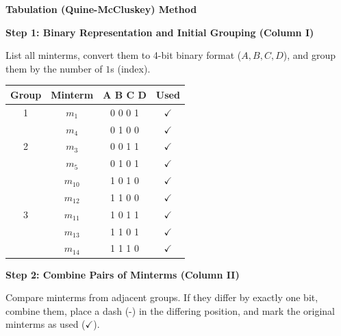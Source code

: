 \documentclass[12pt,a3paper]{article}
\begin{document}
\begin{enumerate}
\begin{tcolorbox}[enhanced,breakable,ansbox,colback=cC!4,colframe=cC,boxrule=0.8pt,arc=5pt,title={\textbf{Answer}},fonttitle=\bfseries\color{white},colbacktitle=cC]
\textbf{\large Tabulation (Quine-McCluskey) Method}

\vspace{0.5em}
\textbf{Step 1: Binary Representation and Initial Grouping (Column I)}

List all minterms, convert them to 4-bit binary format ($A, B, C, D$), and group them by the number of $1$s (index).

\begin{center}
\begin{tabular}{cccc}
\toprule
\textbf{Group} & \textbf{Minterm} & \textbf{A B C D} & \textbf{Used} \\
\midrule
1 & $m_1$  & 0 0 0 1 & $\checkmark$ \\
  & $m_4$  & 0 1 0 0 & $\checkmark$ \\
\midrule
2 & $m_3$  & 0 0 1 1 & $\checkmark$ \\
  & $m_5$  & 0 1 0 1 & $\checkmark$ \\
  & $m_{10}$ & 1 0 1 0 & $\checkmark$ \\
  & $m_{12}$ & 1 1 0 0 & $\checkmark$ \\
\midrule
3 & $m_{11}$ & 1 0 1 1 & $\checkmark$ \\
  & $m_{13}$ & 1 1 0 1 & $\checkmark$ \\
  & $m_{14}$ & 1 1 1 0 & $\checkmark$ \\
\bottomrule
\end{tabular}
\end{center}

\vspace{1em}
\textbf{Step 2: Combine Pairs of Minterms (Column II)}

Compare minterms from adjacent groups. If they differ by exactly one bit, combine them, place a dash (-) in the differing position, and mark the original minterms as used ($\checkmark$).


\end{tcolorbox}
\end{enumerate}
\end{document}
